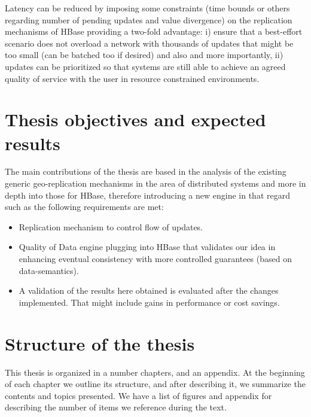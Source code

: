 Latency can be reduced by imposing some constraints (time bounds or others regarding number of pending updates and value divergence) on the replication mechanisms of HBase providing a two-fold advantage: i) ensure that a best-effort scenario does not overload a network with thousands of updates that might be too small (can be batched too if desired) and also and more importantly, ii) updates can be prioritized so that systems are still able to achieve an agreed quality of service with the user in resource constrained environments.


\section{Thesis objectives and expected results}

The main contributions of the thesis are based in the analysis of the existing generic geo-replication mechanisms in the area of distributed systems and more in depth into those for HBase, therefore introducing a new engine in that regard such as the following requirements are met:
\begin{itemize}
\item Replication mechanism to control flow of updates.
\item Quality of Data engine plugging into HBase that validates our idea in enhancing eventual consistency with more controlled guarantees (based on data-semantics).
\item A validation of the results here obtained is evaluated after the changes implemented. That might include gains in performance or cost savings.
\end{itemize}


\section{Structure of the thesis}

This thesis is organized in a number chapters, and an appendix. At the beginning of each chapter we outline its structure, and after describing it, we summarize the contents and topics presented. We have a list of figures and appendix for describing the number of items we reference during the text.


